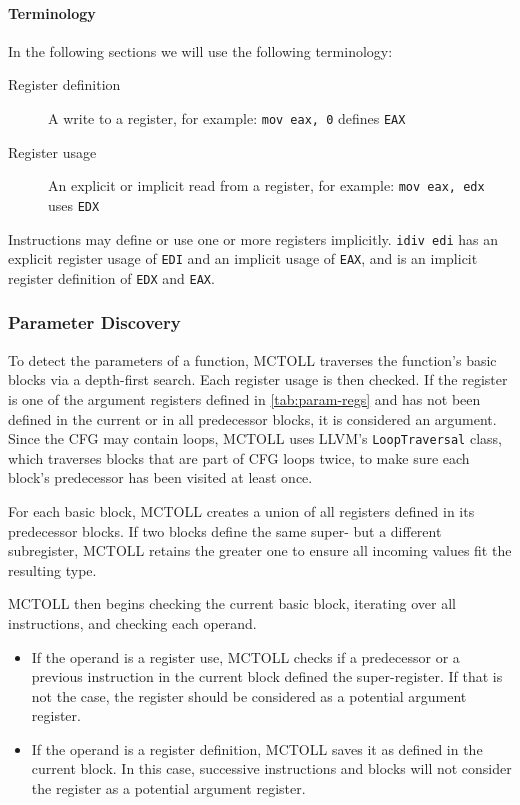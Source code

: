 \paragraph{Terminology}
In the following sections we will use the following terminology:
\begin{description}
    \item[Register definition] A write to a register, for example: \texttt{mov eax, 0} defines \texttt{EAX}
    \item[Register usage] An explicit or implicit read from a register, for example: \texttt{mov eax, edx} uses \texttt{EDX}
\end{description}

Instructions may define or use one or more registers implicitly.
\texttt{idiv edi} has an explicit register usage of \texttt{EDI} and an implicit usage of \texttt{EAX}, and is an implicit register definition of \texttt{EDX} and \texttt{EAX}.

\subsubsection{Parameter Discovery}\label{subsubsec:param-discovery}

To detect the parameters of a function, MCTOLL traverses the function's basic blocks via a depth-first search.
Each register usage is then checked.
If the register is one of the argument registers defined in \cref{tab:param-regs} and has not been defined in the current or in all predecessor blocks, it is considered an argument.
Since the \gls{CFG} may contain loops, MCTOLL uses LLVM's \texttt{LoopTraversal} class, which traverses blocks that are part of \gls{CFG} loops twice, to make sure each block's predecessor has been visited at least once.

For each basic block, MCTOLL creates a union of all registers defined in its predecessor blocks.
If two blocks define the same super- but a different subregister, MCTOLL retains the greater one to ensure all incoming values fit the resulting type.

MCTOLL then begins checking the current basic block, iterating over all instructions, and checking each operand.
\begin{itemize}
    \item If the operand is a register use, MCTOLL checks if a predecessor or a previous instruction in the current block defined the super-register.
    If that is not the case, the register should be considered as a potential argument register.
    \item If the operand is a register definition, MCTOLL saves it as defined in the current block.
    In this case, successive instructions and blocks will not consider the register as a potential argument register.
\end{itemize}

